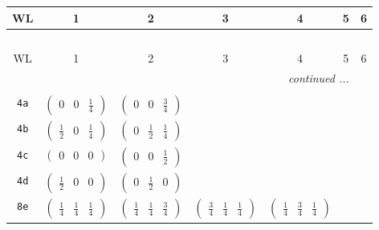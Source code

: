 \documentclass[fleqn,9pt,landscape]{jsarticle}
\begin{document}
\begin{center}
\renewcommand{\arraystretch}{1.2}
\begin{longtable}{ccccccc}
 \hline \hline
WL & 1 & 2 & 3 & 4 & 5 & 6 \\ \hline \endfirsthead

\multicolumn{6}{l}{\tablename\ \thetable{}} \\
 \hline \hline
WL & 1 & 2 & 3 & 4 & 5 & 6 \\ \hline \endhead

 \hline \hline
\multicolumn{6}{r}{\footnotesize\it continued ...} \\ \endfoot

 \hline \hline
\multicolumn{6}{r}{} \\ \endlastfoot

{\tt 4a} & $ \begin{pmatrix} 0 & 0 & \frac{1}{4} \end{pmatrix} $ & $ \begin{pmatrix} 0 & 0 & \frac{3}{4} \end{pmatrix} $ & $  $ & $  $ & $  $ & $  $ \\ \hline
{\tt 4b} & $ \begin{pmatrix} \frac{1}{2} & 0 & \frac{1}{4} \end{pmatrix} $ & $ \begin{pmatrix} 0 & \frac{1}{2} & \frac{1}{4} \end{pmatrix} $ & $  $ & $  $ & $  $ & $  $ \\ \hline
{\tt 4c} & $ \begin{pmatrix} 0 & 0 & 0 \end{pmatrix} $ & $ \begin{pmatrix} 0 & 0 & \frac{1}{2} \end{pmatrix} $ & $  $ & $  $ & $  $ & $  $ \\ \hline
{\tt 4d} & $ \begin{pmatrix} \frac{1}{2} & 0 & 0 \end{pmatrix} $ & $ \begin{pmatrix} 0 & \frac{1}{2} & 0 \end{pmatrix} $ & $  $ & $  $ & $  $ & $  $ \\ \hline
{\tt 8e} & $ \begin{pmatrix} \frac{1}{4} & \frac{1}{4} & \frac{1}{4} \end{pmatrix} $ & $ \begin{pmatrix} \frac{1}{4} & \frac{1}{4} & \frac{3}{4} \end{pmatrix} $ & $ \begin{pmatrix} \frac{3}{4} & \frac{1}{4} & \frac{1}{4} \end{pmatrix} $ & $ \begin{pmatrix} \frac{1}{4} & \frac{3}{4} & \frac{1}{4} \end{pmatrix} $ & $  $ & $  $ \\ \hline

\end{longtable}
\end{center}
\end{document}
